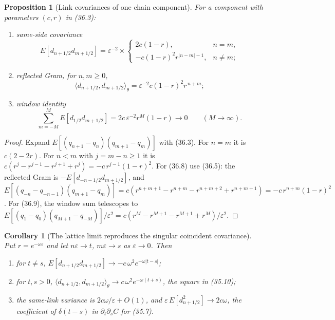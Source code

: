 \documentclass[11pt]{article}
\newtheorem{proposition}[theorem]{Proposition}
\newtheorem{corollary}[theorem]{Corollary}
\theoremstyle{remark}
\begin{document}
\begin{proposition}[Link covariances of one chain component]
\label{prop:v19v33-covariance}
For a component with parameters \((c,r)\) in (36.3):
\begin{enumerate}
\item same-side covariance
\[
 E[d_{n+1/2}d_{m+1/2}]
 =\varepsilon^{-2}\times
 \begin{cases}
  2c(1-r), & n=m,\\
  -c(1-r)^2r^{|n-m|-1}, & n\neq m;
 \end{cases}                                                   \tag{36.7}
\]
\item reflected Gram, for \(n,m\geq0\),
\[
 \langle d_{n+1/2},d_{m+1/2}\rangle_\theta
 =\varepsilon^{-2}c(1-r)^2r^{\,n+m};                            \tag{36.8}
\]
\item window identity
\[
 \sum_{m=-M}^{M}E[d_{1/2}d_{m+1/2}]
 =2c\,\varepsilon^{-2}r^{M}(1-r)\longrightarrow0
 \qquad(M\to\infty).                                            \tag{36.9}
\]
\end{enumerate}
\end{proposition}

\begin{proof}
Expand \(E[(q_{n+1}-q_n)(q_{m+1}-q_m)]\) with (36.3).  For \(n=m\) it is
\(c(2-2r)\).  For \(n<m\) with \(j=m-n\geq1\) it is
\(c(r^{j}-r^{j-1}-r^{j+1}+r^{j})=-c\,r^{j-1}(1-r)^2\).  For (36.8) use
(36.5): the reflected Gram is
\(-E[d_{-n-1/2}d_{m+1/2}]\), and
\(E[(q_{-n}-q_{-n-1})(q_{m+1}-q_m)]
=c(r^{n+m+1}-r^{n+m}-r^{n+m+2}+r^{n+m+1})=-c\,r^{n+m}(1-r)^2\).
For (36.9), the window sum telescopes to
\(E[(q_1-q_0)(q_{M+1}-q_{-M})]/\varepsilon^2
=c(r^{M}-r^{M+1}-r^{M+1}+r^{M})/\varepsilon^2\).
\end{proof}

\begin{corollary}[The lattice limit reproduces the singular coincident covariance]
\label{cor:v19v33-limit}
Put \(r=e^{-\omega\varepsilon}\) and let \(n\varepsilon\to t\),
\(m\varepsilon\to s\) as \(\varepsilon\to0\).  Then
\begin{enumerate}
\item for \(t\neq s\), \(E[d_{n+1/2}d_{m+1/2}]\to-c\,\omega^2e^{-\omega|t-s|}\);
\item for \(t,s>0\),
      \(\langle d_{n+1/2},d_{m+1/2}\rangle_\theta\to c\,\omega^2e^{-\omega(t+s)}\),
      the square in (35.10);
\item the same-link variance is \(2c\omega/\varepsilon+O(1)\), and
      \(\varepsilon\,E[d_{n+1/2}^2]\to2c\omega\), the coefficient of
      \(\delta(t-s)\) in \(\partial_t\partial_sC\) for (35.7).
\end{enumerate}
\end{corollary}
\end{document}
